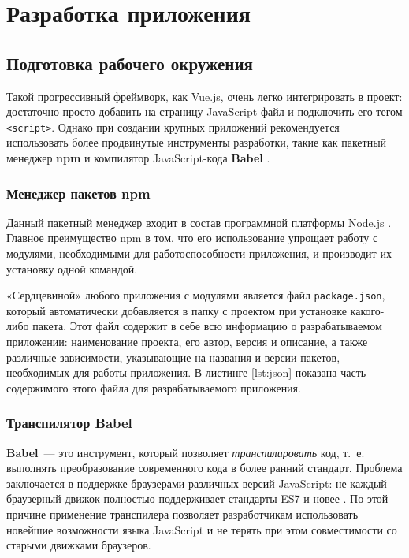 \chapter{Разработка приложения}
\label{cha:impl}

\section{Подготовка рабочего окружения}

Такой прогрессивный фреймворк, как Vue.js, очень легко интегрировать в проект: достаточно просто добавить на страницу JavaScript-файл и подключить его тегом \texttt{<script>}. Однако при создании крупных приложений рекомендуется использовать более продвинутые инструменты разработки, такие как пакетный менеджер \textbf{npm} \cite{npm} и компилятор JavaScript-кода \textbf{Babel} \cite{babel}.

\subsection{Менеджер пакетов npm}
Данный пакетный менеджер входит в состав программной платформы Node.js \cite{nodejs}. Главное преимущество npm в том, что его использование упрощает работу с модулями, необходимыми для работоспособности приложения, и производит их установку одной командой.

«Сердцевиной» любого приложения с модулями является файл \texttt{package.json}, который автоматически добавляется в папку с проектом при установке какого-либо пакета. Этот файл содержит в себе всю информацию о разрабатываемом приложении: наименование проекта, его автор, версия и описание, а также различные зависимости, указывающие на названия и версии пакетов, необходимых для работы приложения. В листинге \ref{lst:json} показана часть содержимого этого файла для разрабатываемого приложения.

\subsection{Транспилятор Babel}
\textbf{Babel}~--- это инструмент, который позволяет \textit{транспилировать} код, т.~е. выполнять преобразование современного кода в более ранний стандарт. Проблема заключается в поддержке браузерами различных версий JavaScript: не каждый браузерный движок полностью поддерживает стандарты ES7 и новее \cite{ecma}. По этой причине применение транспилера позволяет разработчикам использовать новейшие возможности языка JavaScript и не терять при этом совместимости со старыми движками браузеров.

